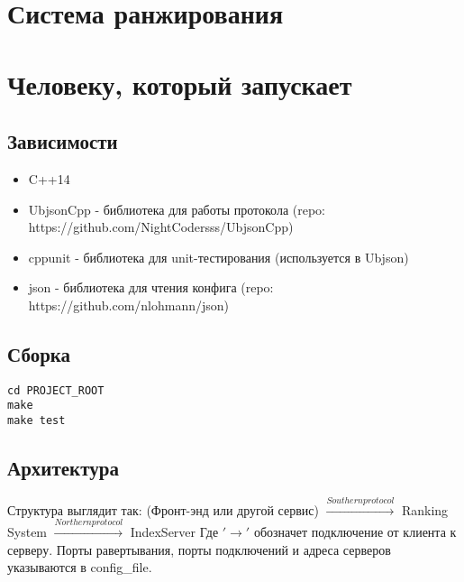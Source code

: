 \documentclass[12pt,a4paper]{article}
\begin{document}
\section{Система ранжирования}
\section{Человеку, который запускает}

\subsection{Зависимости}
\begin{itemize}
    \item C++14
    \item UbjsonCpp  - библиотека для работы протокола (repo: https://github.com/NightCodersss/UbjsonCpp)
    \item cppunit - библиотека для unit-тестирования (используется в Ubjson)
	\item json - библиотека для чтения конфига (repo: https://github.com/nlohmann/json)
\end{itemize}

\subsection{Сборка}
\begin{verbatim}
cd PROJECT_ROOT
make
make test
\end{verbatim}

\subsection{Архитектура}
\label{subsec:generalStructure}
Структура выглядит так:
(Фронт-энд или другой сервис) $\xrightarrow{Southern protocol}$ Ranking System $\xrightarrow{Northern protocol}$ IndexServer
Где $'\rightarrow'$ обозначет подключение от клиента к серверу. Порты равертывания, порты подключений и адреса серверов указываются в config_file.
\end{document}
